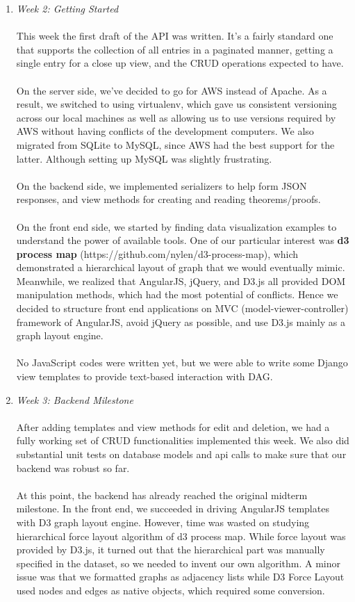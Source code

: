 \documentclass{acm_proc_article-sp}
\begin{document}
\begin{enumerate}
\item \emph{Week 2: Getting Started }\\\\
This week the first draft of the API was written. It's a fairly
standard one that supports the collection of all entries in
a paginated manner, getting a single entry for a close up view,
and the CRUD operations expected to have. \\\\
On the server side, we've decided to go for AWS instead of Apache. As a result, we switched to using virtualenv, which gave us consistent versioning across our local machines as well as allowing us to use versions required by AWS without having conflicts of the development computers. We also migrated from SQLite to MySQL, since AWS had the best support for the latter. Although setting up MySQL was slightly frustrating.\\\\
On the backend side, we implemented serializers to help form JSON responses, and view methods for creating and reading theorems/proofs.\\\\
On the front end side, we started by finding data visualization examples to understand the power of available tools. One of our particular interest was \textbf{d3 process map} (https://github.com/nylen/d3-process-map), which demonstrated a hierarchical layout of graph that we would eventually mimic. Meanwhile, we realized that AngularJS, jQuery, and D3.js all provided DOM manipulation methods, which had the most potential of conflicts. Hence we decided to structure front end applications on MVC (model-viewer-controller) framework of AngularJS, avoid jQuery as possible, and use D3.js mainly as a graph layout engine.\\\\
No JavaScript codes were written yet, but we were able to write some Django view templates to provide text-based interaction with DAG.
\\

\item \emph{Week 3: Backend Milestone}\\\\
After adding templates and view methods for edit and deletion, we had a fully working set of CRUD functionalities implemented this week. We also did substantial unit tests on database models and api calls to make sure that our backend was robust so far. \\\\
At this point, the backend has already reached the original midterm milestone. In the front end, we succeeded in driving AngularJS templates with D3 graph layout engine. However, time was wasted on studying hierarchical force layout algorithm of d3 process map. While force layout was provided by D3.js, it turned out that the hierarchical part was manually specified in the dataset, so we needed to invent our own algorithm. A minor issue was that we formatted graphs as adjacency lists while D3 Force Layout used nodes and edges as native objects, which required some conversion.\\


\end{enumerate}
\end{document}
